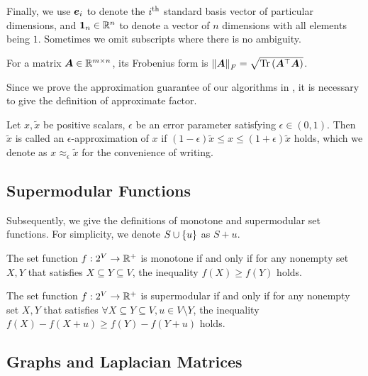\documentclass[sigconf]{acmart}
\begin{document}
Finally, we use \(\boldsymbol{e}_i\) to denote the \({i}^{\rm{th}}\) standard basis vector of particular dimensions, and \(\boldsymbol{1}_n\in \mathbb{R}^n\) to denote a vector of \(n\) dimensions with all elements being \(1\).
Sometimes we omit subscripts where there is no ambiguity.

For a matrix \(\boldsymbol{A}\in\mathbb{R}^{m\times n}\), its Frobenius form is \(\left\Vert\boldsymbol{A}\right\Vert_F=\sqrt{\mathrm{Tr}\left(\boldsymbol{A}^\top\boldsymbol{A}\right)}\).

Since we prove the approximation guarantee of our algorithms in , it is necessary to give the definition of approximate factor.

\begin{definition}
    Let \(x,\tilde{x}\) be positive scalars, \(\epsilon\) be an error parameter satisfying \(\epsilon\in(0,1)\).
    Then \(\tilde{x}\) is called an \(\epsilon\)-approximation of \(x\) if \((1-\epsilon)\tilde{x}\le x\le(1+\epsilon)\tilde{x}\) holds, which we denote as \(x\approx_{\epsilon}\tilde{x}\) for the convenience of writing.
\end{definition}

\subsection{Supermodular Functions}

Subsequently, we give the definitions of monotone and supermodular set functions. For simplicity, we denote \(S\cup\left\{u \right\}\) as \(S+u\).

\begin{definition}[Monotonicity]
    The set function \(f:2^{V}\to\mathbb{R}^+\) is monotone if and only if for any nonempty set \(X,Y\) that satisfies \(X\subseteq Y\subseteq V\), the inequality \(f(X)\ge f(Y)\) holds.
\end{definition}

\begin{definition}[Supermodularity]
    The set function \(f:2^{V}\to\mathbb{R}^+\) is supermodular if and only if for any nonempty set \(X,Y\) that satisfies \(\forall X\subseteq Y\subseteq V, u\in V\setminus Y\), the inequality \(f(X)-f(X+u)\ge f(Y)-f(Y+u)\) holds.
\end{definition}

\subsection{Graphs and Laplacian Matrices}\label{sub:lap}
\end{document}
